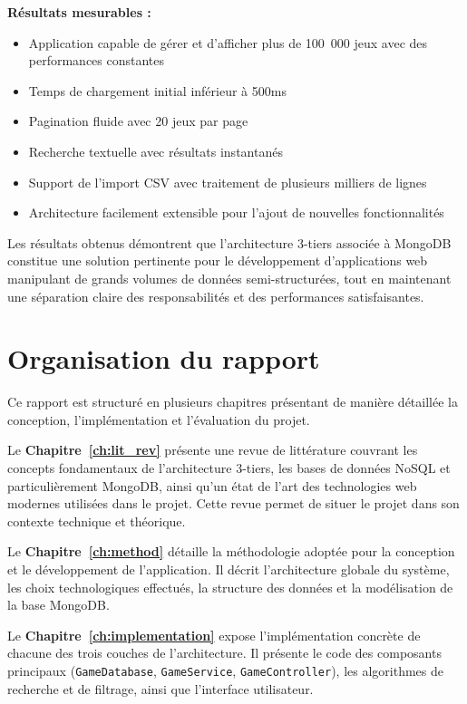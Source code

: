 \textbf{Résultats mesurables :}

\begin{itemize}
    \item Application capable de gérer et d'afficher plus de 100~000 jeux avec des performances constantes
    \item Temps de chargement initial inférieur à 500ms
    \item Pagination fluide avec 20 jeux par page
    \item Recherche textuelle avec résultats instantanés
    \item Support de l'import CSV avec traitement de plusieurs milliers de lignes
    \item Architecture facilement extensible pour l'ajout de nouvelles fonctionnalités
\end{itemize}

Les résultats obtenus démontrent que l'architecture 3-tiers associée à MongoDB constitue une solution pertinente pour le développement d'applications web manipulant de grands volumes de données semi-structurées, tout en maintenant une séparation claire des responsabilités et des performances satisfaisantes.

\section{Organisation du rapport}
\label{sec:intro_org}

Ce rapport est structuré en plusieurs chapitres présentant de manière détaillée la conception, l'implémentation et l'évaluation du projet.

Le \textbf{Chapitre~\ref{ch:lit_rev}} présente une revue de littérature couvrant les concepts fondamentaux de l'architecture 3-tiers, les bases de données NoSQL et particulièrement MongoDB, ainsi qu'un état de l'art des technologies web modernes utilisées dans le projet. Cette revue permet de situer le projet dans son contexte technique et théorique.

Le \textbf{Chapitre~\ref{ch:method}} détaille la méthodologie adoptée pour la conception et le développement de l'application. Il décrit l'architecture globale du système, les choix technologiques effectués, la structure des données et la modélisation de la base MongoDB.

Le \textbf{Chapitre~\ref{ch:implementation}} expose l'implémentation concrète de chacune des trois couches de l'architecture. Il présente le code des composants principaux (\texttt{GameDatabase}, \texttt{GameService}, \texttt{GameController}), les algorithmes de recherche et de filtrage, ainsi que l'interface utilisateur.

